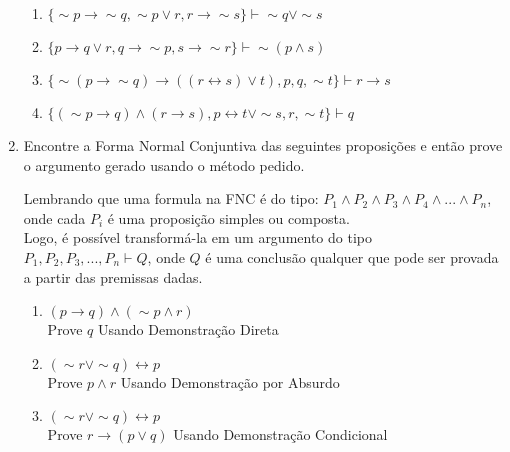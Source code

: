 \documentclass[12pt, a4paper,final]{article}
\begin{document}
\begin{enumerate}
\begin{enumerate}
            \item $ \{ \sim p \rightarrow \sim q, \sim p \vee r, r \rightarrow \sim s \} \vdash \sim q \vee \sim s $ %
            
            \item $\{ p \rightarrow q \vee r, q \rightarrow \sim p, s \rightarrow \sim r \} \vdash \sim (p \wedge s) $ %
            
            \item $\{ \sim (p \rightarrow \sim q) \rightarrow ((r \leftrightarrow s) \vee t), p, q, \sim t \} \vdash r \rightarrow s$ %
            
            \item $\{ (\sim p \rightarrow q) \wedge (r \rightarrow s), p \leftrightarrow t \vee \sim s, r, \sim t \} \vdash q$ %
            
        \end{enumerate}
        
        \item Encontre a Forma Normal Conjuntiva das seguintes proposições e então prove o argumento gerado usando o método pedido.
        
        \begin{adjustwidth}{1.25cm}{1cm}
            Lembrando que uma formula na FNC é do tipo: $P_1 \wedge P_2 \wedge P_3 \wedge P_4 \wedge ... \wedge P_n$, onde cada $P_i$ é uma proposição simples ou composta.\\ 
            Logo, é possível transformá-la em um  argumento do tipo\\ $P_1, P_2, P_3, ..., P_n \vdash Q$, onde $Q$ é uma conclusão qualquer que pode ser provada a partir das premissas dadas. %
        \end{adjustwidth}
        
        \begin{enumerate}
            \item $(p \rightarrow q) \wedge (\sim p \wedge r)$ \\ Prove $q$ Usando Demonstração Direta
            
            \item $(\sim r \vee \sim q) \leftrightarrow p$ \\ Prove $p \wedge r$ Usando Demonstração por Absurdo
            
            \item $(\sim r \vee \sim q) \leftrightarrow p$ \\ Prove $r \rightarrow (p \vee q)$ Usando Demonstração Condicional

        \end{enumerate}
        
    \end{enumerate}
\end{document}
